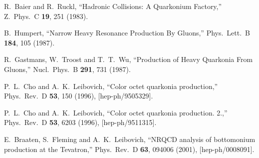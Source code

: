 \documentclass[aps,prc,preprint,superscriptaddress,showpacs,showkeys,amsmath]{revtex4-1}
\begin{document}
\begin{thebibliography}{100}

  








%
  R.~Baier and R.~Ruckl,
  ``Hadronic Collisions: A Quarkonium Factory,''
  Z.\ Phys.\ C {\bf 19}, 251 (1983).


  B.~Humpert,
  ``Narrow Heavy Resonance Production By Gluons,''
  Phys.\ Lett.\ B {\bf 184}, 105 (1987).



  R.~Gastmans, W.~Troost and T.~T.~Wu,
  ``Production of Heavy Quarkonia From Gluons,''
  Nucl.\ Phys.\ B {\bf 291}, 731 (1987).



  P.~L.~Cho and A.~K.~Leibovich,
  ``Color octet quarkonia production,''
  Phys.\ Rev.\ D {\bf 53}, 150 (1996),
  [hep-ph/9505329].

  P.~L.~Cho and A.~K.~Leibovich,
  ``Color octet quarkonia production. 2.,''
  Phys.\ Rev.\ D {\bf 53}, 6203 (1996),
  [hep-ph/9511315].

  E.~Braaten, S.~Fleming and A.~K.~Leibovich,
  ``NRQCD analysis of bottomonium production at the Tevatron,''
  Phys.\ Rev.\ D {\bf 63}, 094006 (2001),
  [hep-ph/0008091].



\end{thebibliography}
\end{document}
